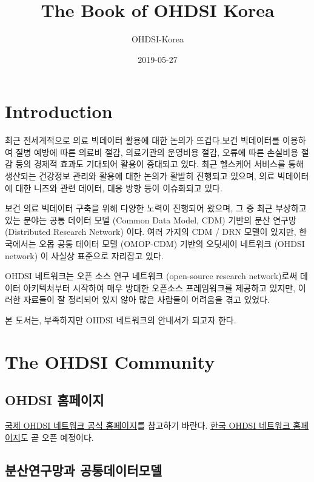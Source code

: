 \documentclass[]{book}
\title{The Book of OHDSI Korea}
\author{OHDSI-Korea}
\date{2019-05-27}
\begin{document}
\maketitle

{
\setcounter{tocdepth}{1}
\tableofcontents
}
\hypertarget{introduction}{%
\chapter{Introduction}\label{introduction}}

최근 전세계적으로 의료 빅데이터 활용에 대한 논의가 뜨겁다.보건 빅데이터를 이용하여 질병 예방에 따른 의료비 절감, 의료기관의 운영비용 절감, 오류에 따른 손실비용 절감 등의 경제적 효과도 기대되어 활용이 증대되고 있다. 최근 헬스케어 서비스를 통해 생산되는 건강정보 관리와 활용에 대한 논의가 활발히 진행되고 있으며, 의료 빅데이터에 대한 니즈와 관련 데이터, 대응 방향 등이 이슈화되고 있다.

보건 의료 빅데이터 구축을 위해 다양한 노력이 진행되어 왔으며, 그 중 최근 부상하고 있는 분야는 공통 데이터 모델 (Common Data Model, CDM) 기반의 분산 연구망 (Distributed Research Network) 이다. 여러 가지의 CDM / DRN 모델이 있지만, 한국에서는 오몹 공통 데이터 모델 (OMOP-CDM) 기반의 오딧세이 네트워크 (OHDSI network) 이 사실상 표준으로 자리잡고 있다.

OHDSI 네트워크는 오픈 소스 연구 네트워크 (open-source research network)로써 데이터 아키텍처부터 시작하여 매우 방대한 오픈소스 프레임워크를 제공하고 있지만, 이러한 자료들이 잘 정리되어 있지 않아 많은 사람들이 어려움을 겪고 있었다.

본 도서는, 부족하지만 OHDSI 네트워크의 안내서가 되고자 한다.

\hypertarget{ohdsiCommunity}{%
\chapter{The OHDSI Community}\label{ohdsiCommunity}}

\hypertarget{ohdsi-}{%
\section{OHDSI 홈페이지}\label{ohdsi-}}

\href{https://www.ohdsi.org/}{국제 OHDSI 네트워크 공식 홈페이지}를 참고하기 바란다. \href{https://www.ohdsi-korea.org/}{한국 OHDSI 네트워크 홈페이지}도 곧 오픈 예정이다.

\hypertarget{drnCdm}{%
\section{분산연구망과 공통데이터모델}\label{drnCdm}}
\end{document}
